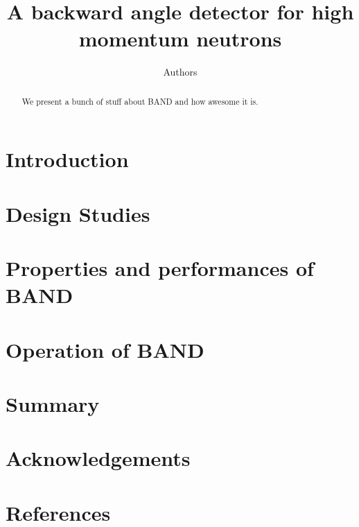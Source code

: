 \documentclass[review]{elsarticle}
\begin{document}
\begin{frontmatter}

\title{A backward angle detector for high momentum neutrons}

\author{Authors}
\address{Addresses}

\author[]{}
\ead[]{}

\begin{abstract}
We present a bunch of stuff about BAND and how awesome it is.
\end{abstract}

\begin{keyword}
\end{keyword}
\end{frontmatter}

\linenumbers

\section{Introduction}


\section{Design Studies}


\section{Properties and performances of BAND}


\section{Operation of BAND}


\section{Summary}


\section{Acknowledgements}


\section*{References}

\end{document}
